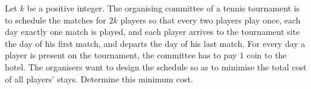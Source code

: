 Let $k$ be a positive integer. The organising committee of a tennis tournament is to schedule the matches for $2k$ players so that every two players play once, each day exactly one match is played, and each player arrives to the tournament site the day of his first match, and departs the day of his last match. For every day a player is present on the tournament, the committee has to pay $1$ coin to the hotel. The organisers want to design the schedule so as to minimise the total cost of all players' stays. Determine this minimum cost.

